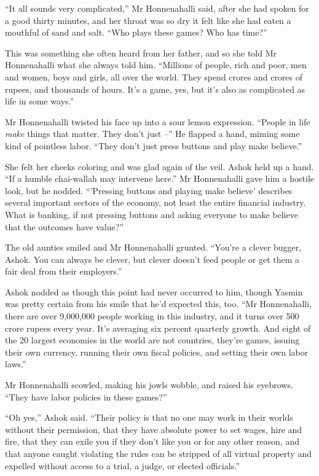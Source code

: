 ``It all sounds very complicated,'' Mr Honnenahalli said, after she
had spoken for a good thirty minutes, and her throat was so dry it
felt like she had eaten a mouthful of sand and salt. ``Who plays
these games? Who has time?''

This was something she often heard from her father, and so she told
Mr Honnenahalli what she always told him. ``Millions of people, rich
and poor, men and women, boys and girls, all over the world. They
spend crores and crores of rupees, and thousands of hours. It's a
game, yes, but it's also as complicated as life in some ways.''

Mr Honnenahalli twisted his face up into a sour lemon expression.
``People in life \emph{make} things that matter. They don't just --''
He flapped a hand, miming some kind of pointless labor. ``They don't
just press buttons and play make believe.''

She felt her cheeks coloring and was glad again of the veil. Ashok
held up a hand. ``If a humble chai-wallah may intervene here.'' Mr
Honnenahalli gave him a hostile look, but he nodded. ``'Pressing
buttons and playing make believe' describes several important
sectors of the economy, not least the entire financial industry.
What is banking, if not pressing buttons and asking everyone to
make believe that the outcomes have value?''

The old aunties smiled and Mr Honnenahalli grunted. ``You're a
clever bugger, Ashok. You can always be clever, but clever doesn't
feed people or get them a fair deal from their employers.''

Ashok nodded as though this point had never occurred to him, though
Yasmin was pretty certain from his smile that he'd expected this,
too. ``Mr Honnenahalli, there are over 9,000,000 people working in
this industry, and it turns over 500 crore rupees every year. It's
averaging six percent quarterly growth. And eight of the 20 largest
economies in the world are not countries, they're games, issuing
their own currency, running their own fiscal policies, and setting
their own labor laws.''

Mr Honnenahalli scowled, making his jowls wobble, and raised his
eyebrows. ``They have labor policies in these games?''

``Oh yes,'' Ashok said. ``Their policy is that no one may work in
their worlds without their permission, that they have absolute
power to set wages, hire and fire, that they can exile you if they
don't like you or for any other reason, and that anyone caught
violating the rules can be stripped of all virtual property and
expelled without access to a trial, a judge, or elected
officials.''

